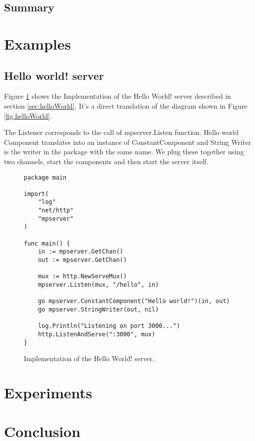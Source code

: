 \documentclass[12pt,a4paper]{article}
\begin{document}
\subsection{Summary}


\newpage
\section{Examples}
\label{sec:examples}
\subsection{Hello world! server}
Figure \ref{fig:HelloWorldImpl} shows the Implementation of the Hello World!
server described in section \ref{sec:helloWorld}.
It's a direct translation of the diagram shown in Figure \ref{fig:helloWorld}.

The Listener corresponds to the call of mpserver.Listen function.
Hello world Component translates into an instance of ConstantComponent
and String Writer is the writer in the package with the same name.
We plug these together using two channels, start the components 
and then start the server itself.

\begin{figure}[h]
\centering
\begin{lstlisting}
package main

import(
    "log"
    "net/http"
    "mpserver"
)

func main() {
    in := mpserver.GetChan()
    out := mpserver.GetChan()

    mux := http.NewServeMux()
    mpserver.Listen(mux, "/hello", in)

    go mpserver.ConstantComponent("Hello world!")(in, out)
    go mpserver.StringWriter(out, nil)
    
    log.Println("Listening on port 3000...")
    http.ListenAndServe(":3000", mux)
}
\end{lstlisting}
\caption[scale=1.0]{Implementation of the Hello World! server.}
\label{fig:HelloWorldImpl}
\end{figure}

\newpage
\section{Experiments}
\label{sec:test}
\newpage
\section{Conclusion}
\label{sec:conclusion}

\newpage
\printbibliography[
    heading=bibintoc,
    title={References}
]
\end{document}
